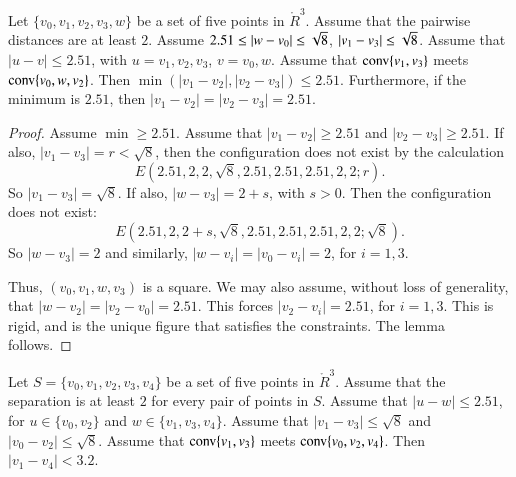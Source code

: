 \newpage

\begin{lemma} 
Let $\{v_0,v_1,v_2,v_3,w\}$  be a set of five points in $\ring{R}^3$.
Assume that the pairwise distances are at least $2$.
Assume $2.51\le|w-v_0|\le\sqrt8$, $|v_1-v_3|\le\sqrt8$.
Assume that $|u-v|\le 2.51$, with $u=v_1,v_2,v_3$,
$v=v_0,w$.
Assume that ${\operatorname{conv}}\{v_1,v_3\}$ meets ${\operatorname{conv}}\{v_0,w,v_2\}$.
Then
$\min(|v_1-v_2|,|v_2-v_3|)\le2.51$. Furthermore, if the minimum is
$2.51$, then $|v_1-v_2|=|v_2-v_3|=2.51$.
\end{lemma}


\begin{proof}
Assume $\min\ge2.51$.  Assume that $|v_1-v_2|\ge 2.51$ and $|v_2-v_3|\ge2.51$.
If also, $|v_1-v_3|=r<\sqrt8$, then the configuration does not
exist by the calculation
  $$
  E(2.51,2,2,\sqrt8,2.51,2.51,2.51,2,2; r).
  $$
So $|v_1-v_3|=\sqrt8$.
If also, $|w-v_3|=2+s$, with $s>0$.  
Then the configuration does not exist:
  $$
  E(2.51,2,2+s,\sqrt8,2.51,2.51,2.51,2,2;\sqrt8). 
  $$
So $|w-v_3|=2$ and similarly, $|w-v_i|=|v_0-v_i|=2$, for $i=1,3$.

Thus, $(v_0,v_1,w,v_3)$ is a square.
 We may also assume, without loss of generality, that
$|w-v_2|=|v_2-v_0|=2.51$. This forces $|v_2-v_i|=2.51$, for $i=1,3$.
This is rigid,  and is the unique figure that satisfies the
constraints. The lemma follows.
\end{proof}

\newpage





\begin{lemma}
Let $S=\{v_0,v_1,v_2,v_3,v_4\}$ be a set of five points in 
$\ring{R}^3$.  Assume that the separation is at least $2$
for every pair of points in $S$.
Assume that $|u-w|\le 2.51$, for
$u\in\{v_0,v_2\}$ and $w\in\{v_1,v_3,v_4\}$.
Assume that $|v_1-v_3|\le \sqrt8$ and $|v_0-v_2|\le\sqrt8$.
Assume that ${\operatorname{conv}}\{v_1,v_3\}$ meets ${\operatorname{conv}}\{v_0,v_2,v_4\}$.
Then $|v_1-v_4|< 3.2$.
\end{lemma}

